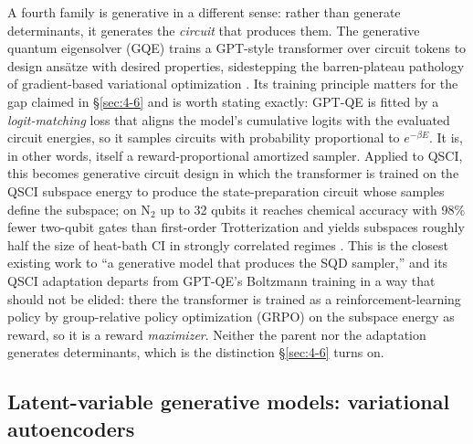 \documentclass[onecolumn,a4paper]{quantumarticle}
\begin{document}
A fourth family is generative in a different sense: rather than generate determinants, it generates the \emph{circuit} that produces them. The generative quantum eigensolver (GQE) trains a GPT-style transformer over circuit tokens to design ansätze with desired properties, sidestepping the barren-plateau pathology of gradient-based variational optimization \cite{nakaji2024}. Its training principle matters for the gap claimed in \S\ref{sec:4-6} and is worth stating exactly: GPT-QE is fitted by a \emph{logit-matching} loss that aligns the model's cumulative logits with the evaluated circuit energies, so it samples circuits with probability proportional to $e^{-\beta E}$. It is, in other words, itself a reward-proportional amortized sampler. Applied to QSCI, this becomes generative circuit design in which the transformer is trained on the QSCI subspace energy to produce the state-preparation circuit whose samples define the subspace; on N$_2$ up to 32 qubits it reaches chemical accuracy with 98\% fewer two-qubit gates than first-order Trotterization and yields subspaces roughly half the size of heat-bath CI in strongly correlated regimes \cite{kemmoku2026}. This is the closest existing work to ``a generative model that produces the SQD sampler,'' and its QSCI adaptation departs from GPT-QE's Boltzmann training in a way that should not be elided: there the transformer is trained as a reinforcement-learning policy by group-relative policy optimization (GRPO) on the subspace energy as reward, so it is a reward \emph{maximizer}. Neither the parent nor the adaptation generates determinants, which is the distinction \S\ref{sec:4-6} turns on.

\subsection{Latent-variable generative models: variational autoencoders}\label{sec:4-5b}
\end{document}
